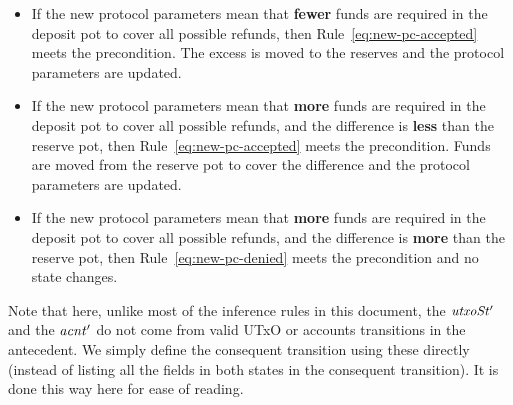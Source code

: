 \begin{itemize}
  \item If the new protocol parameters mean that \textbf{fewer} funds are required in the
    deposit pot to cover all possible refunds, then Rule~\ref{eq:new-pc-accepted} meets
    the precondition. The excess is moved to the reserves and the protocol parameters are updated.

  \item If the new protocol parameters mean that \textbf{more} funds are required in the
    deposit pot to cover all possible refunds, and the difference is \textbf{less} than
    the reserve pot, then Rule~\ref{eq:new-pc-accepted} meets the precondition.  Funds are moved
    from the reserve pot to cover the difference and the protocol parameters are updated.

  \item If the new protocol parameters mean that \textbf{more} funds are required in the
    deposit pot to cover all possible refunds, and the difference is \textbf{more} than
    the reserve pot, then Rule~\ref{eq:new-pc-denied} meets the precondition and no state changes.
\end{itemize}

Note that here, unlike most of the inference rules in this document,
the $\mathit{utxoSt'}$ and the $\mathit{acnt'}$ do not come from valid UTxO or
accounts transitions in the antecedent. We simply define the consequent
transition using these directly (instead of listing all the fields in both
states in the consequent transition). It is done this way here
for ease of reading.

